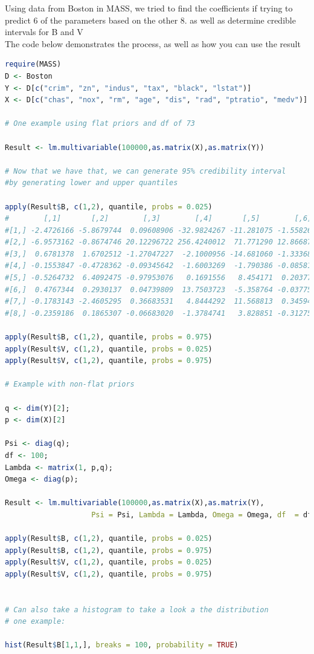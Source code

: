 \documentclass[english]{report}
\begin{document}

Using data from Boston in MASS, we tried to find the coefficients if trying to predict 6 of the parameters based on the other 8. as well as determine credible intervals for B and V\\
The code below demonstrates the process, as well as how you can use the result

\begin{lstlisting}[frame=single, language=R]
require(MASS)
D <- Boston
Y <- D[c("crim", "zn", "indus", "tax", "black", "lstat")]
X <- D[c("chas", "nox", "rm", "age", "dis", "rad", "ptratio", "medv")]

# One example using flat priors and df of 73

Result <- lm.multivariable(100000,as.matrix(X),as.matrix(Y))

# Now that we have that, we can generate 95% credibility interval
#by generating lower and upper quantiles

apply(Result$B, c(1,2), quantile, probs = 0.025)
#        [,1]       [,2]        [,3]        [,4]       [,5]        [,6]
#[1,] -2.4726166 -5.8679744  0.09608906 -32.9824267 -11.281075 -1.55826198
#[2,] -6.9573162 -0.8674746 20.12296722 256.4240012  71.771290 12.86687197
#[3,]  0.6781378  1.6702512 -1.27047227  -2.1000956 -14.681060 -1.33368492
#[4,] -0.1553847 -0.4728362 -0.09345642  -1.6003269  -1.790386 -0.08581789
#[5,] -0.5264732  6.4092475 -0.97953076   0.1691556   8.454171  0.20377180
#[6,]  0.4767344  0.2930137  0.04739809  13.7503723  -5.358764 -0.03775675
#[7,] -0.1783143 -2.4605295  0.36683531   4.8444292  11.568813  0.34594612
#[8,] -0.2359186  0.1865307 -0.06683020  -1.3784741   3.828851 -0.31275303

apply(Result$B, c(1,2), quantile, probs = 0.975)
apply(Result$V, c(1,2), quantile, probs = 0.025)
apply(Result$V, c(1,2), quantile, probs = 0.975)

# Example with non-flat priors

q <- dim(Y)[2];
p <- dim(X)[2]

Psi <- diag(q);
df <- 100;
Lambda <- matrix(1, p,q);
Omega <- diag(p);

Result <- lm.multivariable(100000,as.matrix(X),as.matrix(Y), 
                    Psi = Psi, Lambda = Lambda, Omega = Omega, df  = df)
                    
apply(Result$B, c(1,2), quantile, probs = 0.025)
apply(Result$B, c(1,2), quantile, probs = 0.975)
apply(Result$V, c(1,2), quantile, probs = 0.025)
apply(Result$V, c(1,2), quantile, probs = 0.975)


# Can also take a histogram to take a look a the distribution
# one example:

hist(Result$B[1,1,], breaks = 100, probability = TRUE)

\end{lstlisting}
\end{document}
